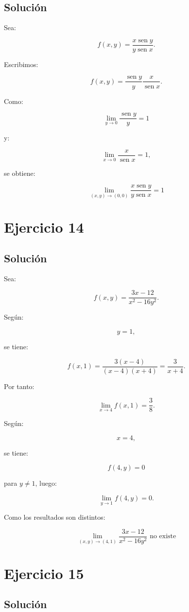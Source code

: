 \documentclass[11pt,a4paper]{article}
\newcommand{\sen}{\operatorname{sen}}
\begin{document}
\subsection{Solución}

Sea:

\[
f(x,y)
=
\frac{x\sen y}{y\sen x}.
\]

Escribimos:

\[
f(x,y)
=
\frac{\sen y}{y}
\frac{x}{\sen x}.
\]

Como:

\[
\lim_{y\to0}\frac{\sen y}{y}=1
\]

y:

\[
\lim_{x\to0}\frac{x}{\sen x}=1,
\]

se obtiene:

\[
\boxed{
\lim_{(x,y)\to(0,0)}
\frac{x\sen y}{y\sen x}
=
1
}
\]

\section{Ejercicio 14}
\subsection{Solución}

Sea:

\[
f(x,y)
=
\frac{3x-12}{x^2-16y^2}.
\]

Según:

\[
y=1,
\]

se tiene:

\[
f(x,1)
=
\frac{3(x-4)}
{(x-4)(x+4)}
=
\frac3{x+4}.
\]

Por tanto:

\[
\lim_{x\to4}f(x,1)
=
\frac38.
\]

Según:

\[
x=4,
\]

se tiene:

\[
f(4,y)=0
\]

para \(y\neq1\), luego:

\[
\lim_{y\to1}f(4,y)=0.
\]

Como los resultados son distintos:

\[
\boxed{
\lim_{(x,y)\to(4,1)}
\frac{3x-12}{x^2-16y^2}
\text{ no existe}
}
\]

\section{Ejercicio 15}
\subsection{Solución}
\end{document}

